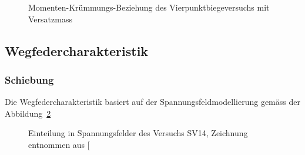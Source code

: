 \documentclass[
  10pt,
  letterpaper,
]{scrreprt}
\begin{document}
\begin{figure}[H]


\caption{\label{fig-mchi_sv14_versatz}Momenten-Krümmungs-Beziehung des
Vierpunktbiegeversuchs mit Versatzmass}

\end{figure}%

\subsection{Wegfedercharakteristik}\label{wegfedercharakteristik-1}

\subsubsection{Schiebung}\label{schiebung-1}

Die Wegfedercharakteristik basiert auf der Spannungsfeldmodellierung
gemäss der Abbildung~\ref{fig-spannungsfelder_sv14}

\begin{figure}[H]


\caption{\label{fig-spannungsfelder_sv14}Einteilung in Spannungsfelder
des Versuchs SV14, Zeichnung entnommen aus
{[}\citeproc{ref-gitz_ansatze_2024}{1}{]}}

\end{figure}%
\end{document}
